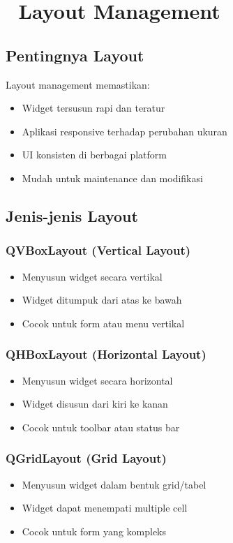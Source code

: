 \section{📐 Layout Management}

\subsection{Pentingnya Layout}

Layout management memastikan:
\begin{itemize}
\item Widget tersusun rapi dan teratur
\item Aplikasi responsive terhadap perubahan ukuran
\item UI konsisten di berbagai platform
\item Mudah untuk maintenance dan modifikasi
\end{itemize}

\subsection{Jenis-jenis Layout}

\subsubsection{QVBoxLayout (Vertical Layout)}
\begin{itemize}
\item Menyusun widget secara vertikal
\item Widget ditumpuk dari atas ke bawah
\item Cocok untuk form atau menu vertikal
\end{itemize}

\subsubsection{QHBoxLayout (Horizontal Layout)}
\begin{itemize}
\item Menyusun widget secara horizontal
\item Widget disusun dari kiri ke kanan
\item Cocok untuk toolbar atau status bar
\end{itemize}

\subsubsection{QGridLayout (Grid Layout)}
\begin{itemize}
\item Menyusun widget dalam bentuk grid/tabel
\item Widget dapat menempati multiple cell
\item Cocok untuk form yang kompleks
\end{itemize}

